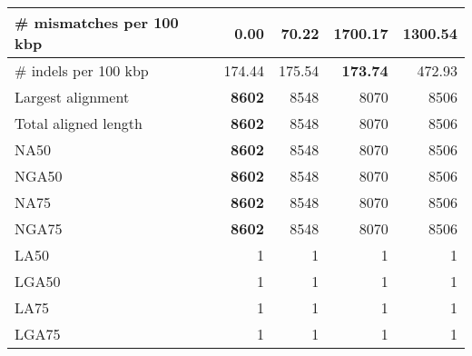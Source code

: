 \documentclass[12pt,a4paper]{article}
\begin{document}
\begin{table}[ht]
\begin{center}
\begin{tabular}{|l*{4}{|r}|}
\# mismatches per 100 kbp & {\bf 0.00} & 70.22 & 1700.17 & 1300.54 \\ \hline
\# indels per 100 kbp & 174.44 & 175.54 & {\bf 173.74} & 472.93 \\ \hline
Largest alignment & {\bf 8602} & 8548 & 8070 & 8506 \\ \hline
Total aligned length & {\bf 8602} & 8548 & 8070 & 8506 \\ \hline
NA50 & {\bf 8602} & 8548 & 8070 & 8506 \\ \hline
NGA50 & {\bf 8602} & 8548 & 8070 & 8506 \\ \hline
NA75 & {\bf 8602} & 8548 & 8070 & 8506 \\ \hline
NGA75 & {\bf 8602} & 8548 & 8070 & 8506 \\ \hline
LA50 & 1 & 1 & 1 & 1 \\ \hline
LGA50 & 1 & 1 & 1 & 1 \\ \hline
LA75 & 1 & 1 & 1 & 1 \\ \hline
LGA75 & 1 & 1 & 1 & 1 \\ \hline
\end{tabular}
\end{center}
\end{table}
\end{document}
